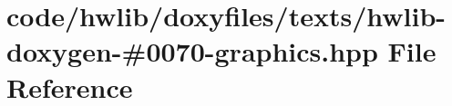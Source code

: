 \hypertarget{hwlib-doxygen-#0070-graphics_8hpp}{}\section{code/hwlib/doxyfiles/texts/hwlib-\/doxygen-\/\#0070-\/graphics.hpp File Reference}
\label{hwlib-doxygen-#0070-graphics_8hpp}
